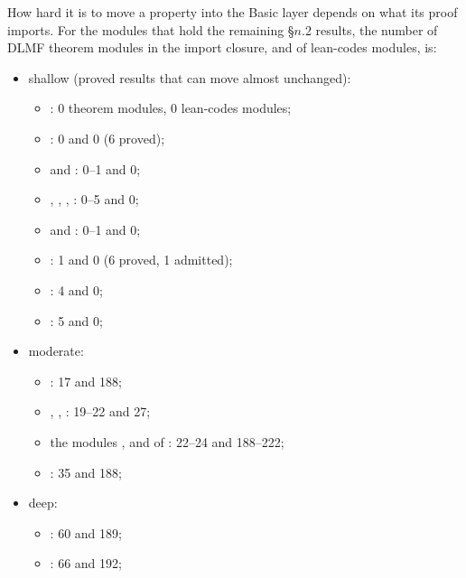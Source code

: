 \documentclass[11pt,a4paper]{article}
\begin{document}
How hard it is to move a property into the Basic layer depends on what its proof imports. For
the modules that hold the remaining \S\(n\).2 results, the number of DLMF theorem modules in the
import closure, and of lean-codes modules, is:
\begin{RaggedRight}
\begin{itemize}
  \item shallow (proved results that can move almost unchanged):
    \begin{itemize}
      \item {}: 0 theorem modules, 0 lean-codes modules;
      \item {}: 0 and 0 (6 proved);
      \item {} and : 0--1 and 0;
      \item {}, , ,
        : 0--5 and 0;
      \item {} and : 0--1
        and 0;
      \item {}: 1 and 0 (6 proved, 1 admitted);
      \item {}: 4 and 0;
      \item {}: 5 and 0;
    \end{itemize}
  \item moderate:
    \begin{itemize}
      \item {}: 17 and 188;
      \item {}, ,
        : 19--22 and 27;
      \item the modules ,  and
         of :
        22--24 and 188--222;
      \item {}: 35 and 188;
    \end{itemize}
  \item deep:
    \begin{itemize}
      \item {}: 60 and 189;
      \item {}: 66 and 192;

\end{itemize}
\end{itemize}
\end{RaggedRight}
\end{document}
